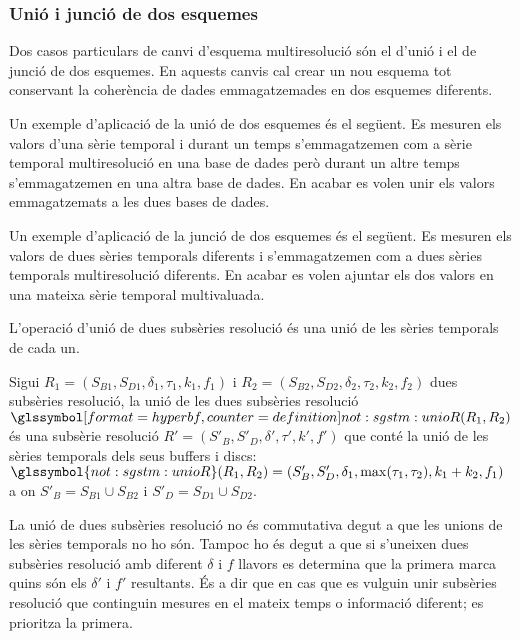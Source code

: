 \subsubsection{Unió i junció de dos esquemes}

Dos casos particulars de canvi d'esquema multiresolució són el d'unió
i el de junció de dos esquemes. En aquests canvis cal crear un nou
esquema tot conservant la coherència de dades emmagatzemades en dos
esquemes diferents.

Un exemple d'aplicació de la unió de dos esquemes és el següent. Es
mesuren els valors d'una sèrie temporal i durant un temps
s'emmagatzemen com a sèrie temporal multiresolució en una base de
dades però durant un altre temps s'emmagatzemen en una altra base de
dades. En acabar es volen unir els valors emmagatzemats a les dues
bases de dades.

Un exemple d'aplicació de la junció de dos esquemes és el següent.  Es
mesuren els valors de dues sèries temporals diferents i s'emmagatzemen
com a dues sèries temporals multiresolució diferents. En acabar es
volen ajuntar els dos valors en una mateixa sèrie temporal
multivaluada.



L'operació d'unió de dues subsèries resolució és una unió de les
sèries temporals de cada un.
\begin{definition}
  Sigui $R_1=(S_{B1},S_{D1},\delta_1,\tau_1,k_1,f_1)$ i
  $R_2=(S_{B2},S_{D2},\delta_2,\tau_2,k_2,f_2)$ dues subsèries
  resolució, la unió de les dues subsèries resolució
  $\glssymboldef{not:sgstm:unioR}(R_1,R_2)$ és una subsèrie resolució $R' =
  (S'_B,S'_D,\delta',\tau',k',f')$ que conté la unió de les sèries
  temporals dels seus buffers i discs: $\glssymbol{not:sgstm:unioR}(R_1,R_2)=
  (S'_B,S'_D,\delta_1,\max(\tau_1,\tau_2),k_1+k_2,f_1)$ a on $S'_B =
  S_{B1} \cup S_{B2}$ i $S'_D = S_{D1} \cup S_{D2}$.
\end{definition}
La unió de dues subsèries resolució no és commutativa degut a que les
unions de les sèries temporals no ho són. Tampoc ho és degut a que si
s'uneixen dues subsèries resolució amb diferent $\delta$ i $f$ llavors
es determina que la primera marca quins són els $\delta'$ i $f'$
resultants.  És a dir que en cas que es vulguin unir subsèries
resolució que continguin mesures en el mateix temps o informació
diferent; es prioritza la primera.


